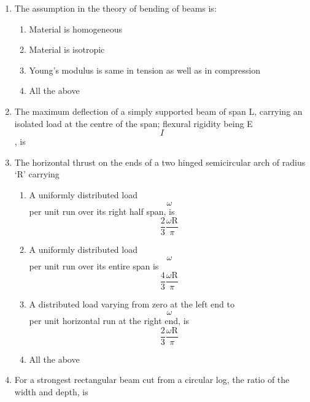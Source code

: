 \documentclass[11pt,a4paper]{article}
\begin{document}
\begin{enumerate}
\begin{enumerate*}[itemjoin=\qquad, label=\Alph*.]
\item{2 cm}
\item{2.5 cm}
\end{enumerate*}
\item{The assumption in the theory of bending of beams is:}
\begin{enumerate}[label=\Alph*.]
\item{Material is homogeneous}
\item{Material is isotropic}
\item{Young's modulus is same in tension as well as in compression}
\item{All the above}
\end{enumerate}
\item{The maximum deflection of a simply supported beam of span L, carrying an isolated load at the centre of the span; flexural rigidity being E$$I$$, is}
\\
\item{The horizontal thrust on the ends of a two hinged semicircular arch of radius `R' carrying
}
\begin{enumerate}[label=\Alph*.]
\item{A uniformly distributed load $$\omega $$ per unit run over its right half span, is $$\frac{2}{3}\frac{{\omega {\text{R}}}}{\pi }$$}
\item{A uniformly distributed load $$\omega $$ per unit run over its entire span is $$\frac{4}{3}\frac{{\omega {\text{R}}}}{\pi }$$}
\item{A distributed load varying from zero at the left end to $$\omega $$ per unit horizontal run at the right end, is $$\frac{2}{3}\frac{{\omega {\text{R}}}}{\pi }$$}
\item{All the above}
\end{enumerate}
\item{For a strongest rectangular beam cut from a circular log, the ratio of the width and depth, is}
\\\begin{enumerate*}[itemjoin=\qquad, label=\Alph*.]

\end{enumerate*}
\end{enumerate}
\end{document}
